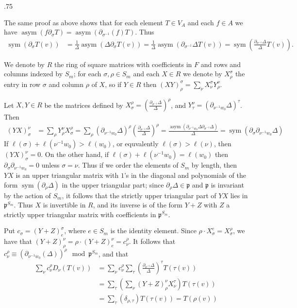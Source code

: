 \documentclass[11pt,fleqn]{article}
\makeatletter
\newcounter{para}[section]
\renewenvironment{proof}[1][\textit{Proof}]{\par
  \pushQED{\qed}%
  \normalfont \topsep.75\paraskip\relax
  \trivlist
  \item[\hskip\labelsep
        \itshape
    #1\@addpunct{.}]\ignorespaces
}{%
  \popQED\endtrivlist\@endpefalse
}
\newcommand\p{\mathfrak p}
\DeclareMathOperator\sym{sym}
\DeclareMathOperator\asym{asym}
\makeatother
\begin{document}
\begin{proof}
The same proof as above shows that for each element $T \in V_A$ and each $f \in
A$ we have $\asym(f \partial_\sigma T) = \asym(\partial_{\sigma^{-1}}(f) T)$.
Thus
\begin{align*}
\sym(\partial_\sigma T(v))
  &= \frac{1}{\Delta}\asym(\Delta \partial_\sigma T(v))
  = \frac{1}{\Delta} \asym(\partial_{\sigma^{-1}}\Delta T(v)) 
  = \sym\left(\frac{\partial_{\sigma^{-1}}\Delta}{\Delta} T(v)\right).
\end{align*}

We denote by $R$ the ring of square matrices with coefficients in $F$ and rows 
and columns indexed by $S_m$; for each $\sigma, \rho \in S_m$ and each $X \in 
R$ we denote by $X^\sigma_\rho$ the entry in row $\sigma$ and column $\rho$ of 
$X$, so if $Y \in R$ then $(X Y)^\sigma_\rho = \sum_\nu X^\sigma_\nu 
Y^\nu_\rho$.

Let $X, Y \in R$ be the matrices defined by $X_\sigma^\rho = \left( 
\frac{\partial_{\sigma^{-1}} \Delta}{\Delta} \right)^\rho$, and $Y_\tau^\nu = 
(\partial_{\nu^{-1} w_0} \Delta)^\tau$. Then
\begin{align*}
(YX)^\nu_\sigma 
  &= \sum_\rho Y_\rho^\nu X^\rho_\sigma
  = \sum_{\rho} (\partial_{\nu^{-1} w_0} \Delta)^\rho 
    \left( 
      \frac{\partial_{\sigma^{-1}} \Delta}{\Delta} 
    \right)^\rho
  = \frac{\asym(\partial_{\nu^{-1} w_0} \Delta\partial_{\sigma^{-1}} \Delta)}
    {\Delta}
  = \sym(\partial_\sigma \partial_{\nu^{-1} w_0} \Delta) 
\end{align*}
If $\ell(\sigma) + \ell(\nu^{-1} w_0) > \ell(w_0)$, or equvalently 
$\ell(\sigma) > \ell(\nu)$, then $(YX)^{\nu}_\sigma = 0$. On the other hand, 
if $\ell(\sigma) + \ell(\nu^{-1} w_0) = \ell(w_0)$ then $\partial_\sigma 
\partial_{\nu^{-1} w_0} = 0$ unless $\sigma = \nu$. Thus if we order the 
elements of $S_m$ by length, then $YX$ is an upper triangular matrix with
$1$'s in the diagonal and polynomials of the form $\sym(\partial_\rho \Delta)$
in the upper triangular part; since $\partial_\rho \Delta \in \p$ and 
$\p$ is invariant by the action of $S_m$, it follows that the strictly
upper triangular part of $YX$ lies in $\p^{S_m}$. Thus $X$ is invertible in 
$R$, and its inverse is of the form $Y + Z$ with $Z$ a strictly upper 
triangular matrix with coefficients in $\p^{S_m}$.

Put $c_\sigma = (Y+Z)^\sigma_e$, where $e \in S_m$ is the identity element.
Since $\rho\cdot X^e_\sigma = X^{\rho}_\sigma$, we have that
$(Y+Z)^\nu_\rho = \rho \cdot (Y+Z)^\nu_e = c_\nu^\rho$. It follows 
that $c_\nu^\rho \equiv (\partial_{\nu^{-1} w_0}(\Delta))^\rho \mod \p^{S_m}$, 
and that
\begin{align*}
\sum_{\nu} c_\nu^\rho D_\nu(T(v))
  &= \sum_\nu c_\nu^\rho 
    \sum_\tau \left(
      \frac{\partial_{\nu^{-1}} \Delta}{\Delta}
    \right)^\tau T(\tau(v))\\
  &= \sum_\tau \left(
      \sum_\nu (Y+Z)^\nu_\rho X_\nu^\tau
    \right) T(\tau(v))\\
  &= \sum_\tau(\delta_{\rho,\tau})T(\tau(v)) 
  = T(\rho(v))
\end{align*}
\end{proof}
\end{document}
